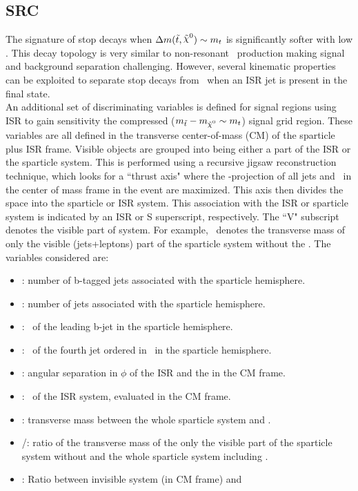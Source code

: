  

\subsection{SRC}
The signature of stop decays when $\Delta m(\stop,\LSP)\sim m_{t}$ is significantly softer with low \met. This decay topology is very similar to non-resonant \ttbar\ production making signal and background separation challenging. However, several kinematic properties can be exploited to separate stop decays from \ttbar\ when an ISR jet is present in the final state. \\

An additional set of discriminating variables is defined for signal regions using ISR to gain sensitivity the compressed ($\mstop-\mLSP\sim m_t$) signal grid region. These variables are all defined in the transverse center-of-mass (CM) of the sparticle plus ISR frame. Visible objects are grouped into being either a part of the ISR or the sparticle system. This is performed using a recursive jigsaw reconstruction technique\cite{RJR_ISR}, which looks for a ``thrust axis" where the \pt-projection of all jets and \met\ in the center of mass frame in the event are maximized.  This axis then divides the space into the sparticle or ISR system.  This association with the ISR or sparticle system is indicated by an ISR or S superscript, respectively. The ``V" subscript denotes the visible part of system.  For example, \mV\ denotes the transverse mass of only the visible (jets+leptons) part of the sparticle system without the \met.  The variables considered are:

\begin{itemize}
\item  \nBJetS: number of b-tagged jets associated with the sparticle hemisphere.
\item \nJetS: number of jets associated with the sparticle hemisphere.
\item  \pTSBZero: \pt\ of the leading b-jet in the sparticle hemisphere.
\item  \pTSFour: \pt\ of the fourth jet ordered in \pt\ in the sparticle hemisphere.
\item  \dPhiISRMET: angular separation in $\phi$ of the ISR and the \met in the CM frame.
\item  \pTISR: \pt\ of the ISR system, evaluated in the CM frame.
\item  \mS: transverse mass between the whole sparticle system and \met.
\item  \mV/\mS: ratio of the transverse mass of the only the visible part of the sparticle system without \met and the whole sparticle system including \met.
\item  \rISR: Ratio between invisible system (\met in CM frame) and \pTISR
\end{itemize}

